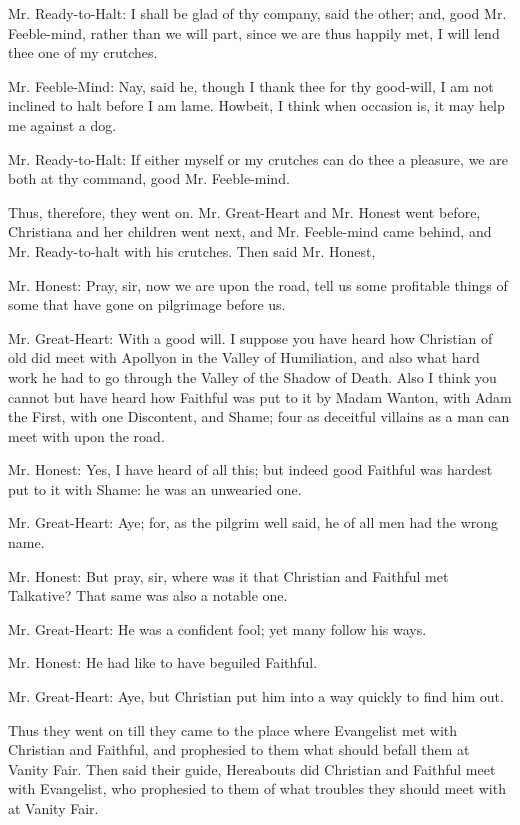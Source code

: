 Mr. Ready-to-Halt: I shall be glad of thy company, said the other; and, good Mr. Feeble-mind, rather than we will part, since we are thus happily met, I will lend thee one of my crutches.

Mr. Feeble-Mind: Nay, said he, though I thank thee for thy good-will, I am not inclined to halt before I am lame. Howbeit, I think when occasion is, it may help me against a dog.

Mr. Ready-to-Halt: If either myself or my crutches can do thee a pleasure, we are both at thy command, good Mr. Feeble-mind.

Thus, therefore, they went on. Mr. Great-Heart and Mr. Honest went before, Christiana and her children went next, and Mr. Feeble-mind came behind, and Mr. Ready-to-halt with his crutches. Then said Mr. Honest,

Mr. Honest: Pray, sir, now we are upon the road, tell us some profitable things of some that have gone on pilgrimage before us.

Mr. Great-Heart: With a good will. I suppose you have heard how Christian of old did meet with Apollyon in the Valley of Humiliation, and also what hard work he had to go through the Valley of the Shadow of Death. Also I think you cannot but have heard how Faithful was put to it by Madam Wanton, with Adam the First, with one Discontent, and Shame; four as deceitful villains as a man can meet with upon the road.

Mr. Honest: Yes, I have heard of all this; but indeed good Faithful was hardest put to it with Shame: he was an unwearied one.

Mr. Great-Heart: Aye; for, as the pilgrim well said, he of all men had the wrong name.

Mr. Honest: But pray, sir, where was it that Christian and Faithful met Talkative? That same was also a notable one.

Mr. Great-Heart: He was a confident fool; yet many follow his ways.

Mr. Honest: He had like to have beguiled Faithful.

Mr. Great-Heart: Aye, but Christian put him into a way quickly to find him out.

Thus they went on till they came to the place where Evangelist met with Christian and Faithful, and prophesied to them what should befall them at Vanity Fair. Then said their guide, Hereabouts did Christian and Faithful meet with Evangelist, who prophesied to them of what troubles they should meet with at Vanity Fair.

